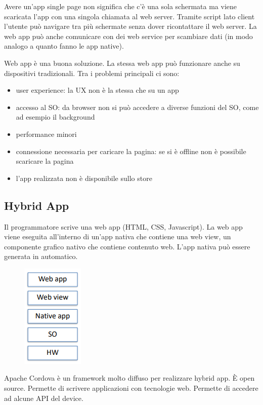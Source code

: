 Avere un'app single page non significa che c'è una sola schermata ma viene scaricata l'app con una singola chiamata al web server. 
Tramite script lato client l'utente può navigare tra più schermate senza dover ricontattare il web server. 
La web app può anche comunicare con dei web service per scambiare dati (in modo analogo a quanto fanno le app native).

Web app è una buona soluzione. La stessa web app può funzionare anche su dispositivi tradizionali.
Tra i problemi principali ci sono: 
\begin{itemize}
    \item user experience: la UX non è la stessa che su un app
    \item accesso al SO: da browser non si può accedere a diverse funzioni del SO, come ad esempio il background
    \item performance minori
    \item connessione necessaria per caricare la pagina: se si è offline non è possibile scaricare la pagina
    \item l'app realizzata non è disponibile sullo store
\end{itemize}

\subsection{Hybrid App}
Il programmatore scrive una web app (HTML, CSS, Javascript). 
La web app viene eseguita all'interno di un'app nativa che 
contiene una web view, un componente grafico nativo che contiene contenuto web. 
L’app nativa può essere generata in automatico.

\begin{figure}[!ht]
    \centering
    \includegraphics[width=.15\textwidth]{images/Mobile computing/7. Sviluppo/hybrid app.PNG}
    \label{fig:hybrid app}
\end{figure}

Apache Cordova è un framework molto diffuso per realizzare hybrid app. È open source.
Permette di scrivere applicazioni con tecnologie web. Permette di accedere ad alcune API del device.

